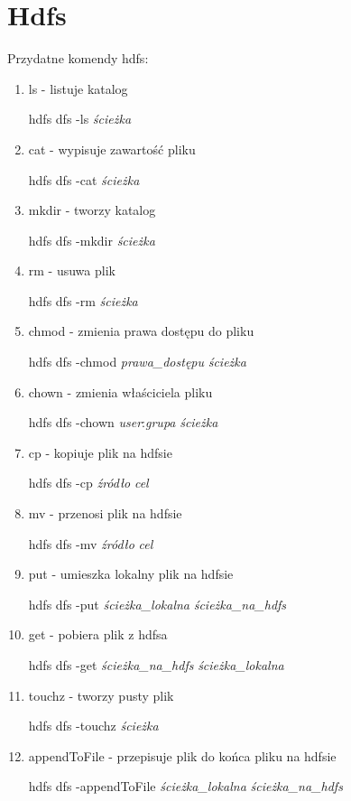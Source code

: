 \documentclass[11pt]{article}
\begin{document}
\section*{Hdfs}

Przydatne komendy hdfs:
\begin{enumerate}
\item ls - listuje katalog

hdfs dfs -ls \textit{ścieżka}

\item cat - wypisuje zawartość pliku

hdfs dfs -cat \textit{ścieżka}

\item mkdir - tworzy katalog

hdfs dfs -mkdir \textit{ścieżka}
 
\item rm - usuwa plik

hdfs dfs -rm \textit{ścieżka}

\item chmod - zmienia prawa dostępu do pliku

hdfs dfs -chmod \textit{prawa\_dostępu} \textit{ścieżka}

\item chown - zmienia właściciela pliku

hdfs dfs -chown \textit{user}:\textit{grupa} \textit{ścieżka}

\item cp - kopiuje plik na hdfsie

hdfs dfs -cp \textit{źródło} \textit{cel}

\item mv - przenosi plik na hdfsie

hdfs dfs -mv \textit{źródło} \textit{cel}

\item put - umieszka lokalny plik na hdfsie

hdfs dfs -put \textit{ścieżka\_lokalna} \textit{ścieżka\_na\_hdfs}

\item get - pobiera plik z hdfsa

hdfs dfs -get \textit{ścieżka\_na\_hdfs} \textit{ścieżka\_lokalna}

\item touchz - tworzy pusty plik

hdfs dfs -touchz \textit{ścieżka}

\item appendToFile - przepisuje plik do końca pliku na hdfsie

hdfs dfs -appendToFile \textit{ścieżka\_lokalna} \textit{ścieżka\_na\_hdfs}

\end{enumerate}
\end{document}
